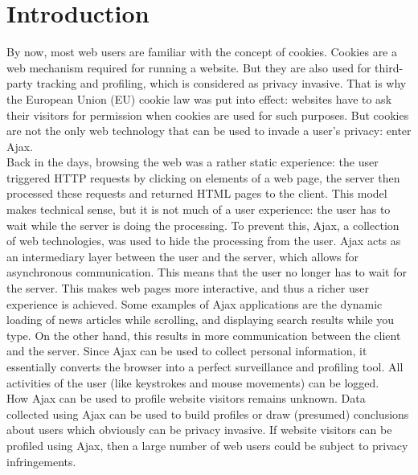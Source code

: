 \section{Introduction}
	
By now, most web users are familiar with the concept of cookies. Cookies are a web mechanism required for running a website. But they are also used for third-party tracking and profiling, which is considered as privacy invasive. That is why the European Union (EU) cookie law was put into effect: websites have to ask their visitors for permission when cookies are used for such purposes. But cookies are not the only web technology that can be used to invade a user's privacy: enter Ajax.\\
	
Back in the days, browsing the web was a rather static experience: the user triggered HTTP requests by clicking on elements of a web page, the server then processed these requests and returned HTML pages to the client. This model makes technical sense, but it is not much of a user experience: the user has to wait while the server is doing the processing. To prevent this, Ajax, a collection of web technologies, was used to hide the processing from the user. Ajax acts as an intermediary layer between the user and the server, which allows for asynchronous communication. This means that the user no longer has to wait for the server. This makes web pages more interactive, and thus a richer user experience is achieved. Some examples of Ajax applications are the dynamic loading of news articles while scrolling, and displaying search results while you type.	On the other hand, this results in more communication between the client and the server. Since Ajax can be used to collect personal information, it essentially converts the browser into a perfect surveillance and profiling tool. All activities of the user (like keystrokes and mouse movements) can be logged.\\
	
How Ajax can be used to profile website visitors remains unknown. Data collected using Ajax can be used to build profiles or draw (presumed) conclusions about users which obviously can be privacy invasive. If website visitors can be profiled using Ajax, then a large number of web users could be subject to privacy infringements.\\	
	

